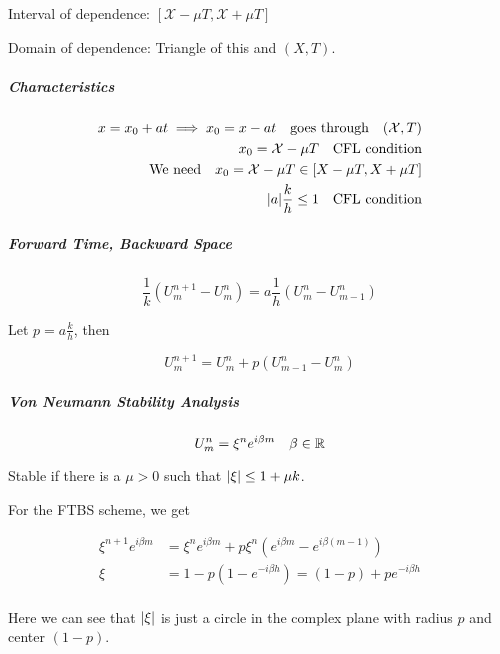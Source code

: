 Interval of dependence: \(\left[ \mathcal{X} - \mu T, \mathcal{X} + \mu T \right]\)

Domain of dependence: Triangle of this and \((X,T)\).

\subparagraph{Characteristics}

\begin{align*}
  x = x_0 + at \implies x_0 = x - at \quad \text{goes through} \quad (\mathcal{X}, T) \\
  x_0 = \mathcal{X} - \mu T \quad \text{CFL condition} \\
  \text{We need} \quad x_0 = \mathcal{X} - \mu T \in [X - \mu T, X + \mu T] \\
  \lvert a\rvert \frac{k}{h} \leq 1 \quad \text{CFL condition}
\end{align*}

\subparagraph{Forward Time, Backward Space}
\[
  \frac{1}{k}\left( U_m^{n+1} - U_m^n \right) = a \frac{1}{h}\left( U_m^n - U_{m-1}^n \right)
\]

Let \(p = a \frac{k}{h}\), then

\[
  U_m^{n+1} = U_m^n + p(U_{m-1}^n - U_m^n)
\]

\subparagraph{Von Neumann Stability Analysis}
\[
  U_m^n = \xi^n e^{i\beta m} \quad \beta \in \mathbb{R}
\]

Stable if there is a \(\mu> 0\) such that \(\lvert\xi\rvert \leq 1 + \mu k \).

For the FTBS scheme, we get

\begin{align*}
  \xi^{n+1} e^{i\beta m} & = \xi^n e^{i\beta m} + p\xi^n\left( e^{i\beta m} - e^{i\beta (m-1)} \right) \\
  \xi                   & = 1 - p(1 - e^{-i\beta h}) = (1 - p) + pe^{-i\beta h}                            \\
\end{align*}

Here we can see that \(\lvert\xi\rvert \) is just a circle in the complex plane with radius \(p\) and center \((1-p)\).


